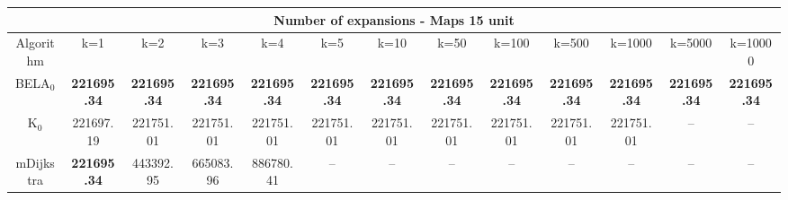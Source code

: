 \begin{tabular}{c|cccccccccccc}\toprule
\multicolumn{13}{c}{Number of expansions - Maps 15 unit}\\ \midrule
Algorithm & k=1 & k=2 & k=3 & k=4 & k=5 & k=10 & k=50 & k=100 & k=500 & k=1000 & k=5000 & k=10000 \\ \midrule
BELA$_0$ & \textbf{221695.34} & \textbf{221695.34} & \textbf{221695.34} & \textbf{221695.34} & \textbf{221695.34} & \textbf{221695.34} & \textbf{221695.34} & \textbf{221695.34} & \textbf{221695.34} & \textbf{221695.34} & \textbf{221695.34} & \textbf{221695.34} \\
K$_0$ & 221697.19 & 221751.01 & 221751.01 & 221751.01 & 221751.01 & 221751.01 & 221751.01 & 221751.01 & 221751.01 & 221751.01 & -- & -- \\
mDijkstra & \textbf{221695.34} & 443392.95 & 665083.96 & 886780.41 & -- & -- & -- & -- & -- & -- & -- & -- \\ \bottomrule 
\end{tabular}
